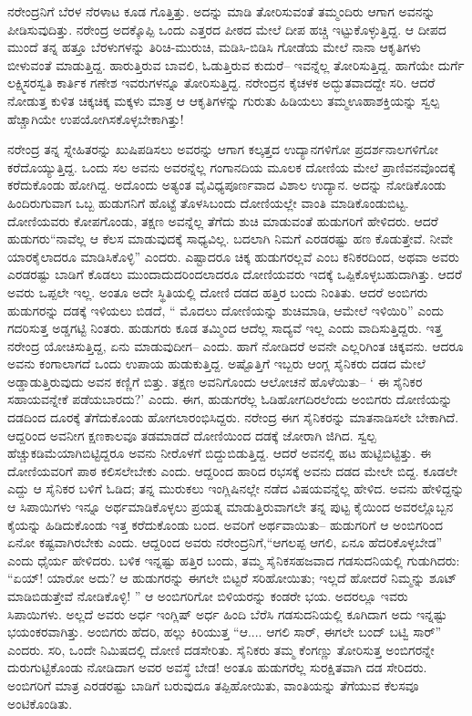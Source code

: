 ನರೇಂದ್ರನಿಗೆ ಬೆರಳ ನೆರಳಾಟ  ಕೂಡ ಗೊತ್ತಿತ್ತು. ಅದನ್ನು ಮಾಡಿ ತೋರಿಸುವಂತೆ ತಮ್ಮಂದಿರು ಆಗಾಗ ಅವನನ್ನು ಪೀಡಿಸುವುದಿತ್ತು. ನರೇಂದ್ರ ಅದಕ್ಕೊಪ್ಪಿ ಒಂದು ಎತ್ತರದ ಪೀಠದ ಮೇಲೆ ದೀಪ ಹಚ್ಚಿ ಇಟ್ಟುಕೊಳ್ಳುತ್ತಿದ್ದ. ಆ ದೀಪದ ಮುಂದೆ ತನ್ನ ಹತ್ತೂ ಬೆರಳುಗಳನ್ನು ತಿರಿಚಿ-ಮುರುಚಿ, ಮಡಿಸಿ-ಬಿಡಿಸಿ ಗೋಡೆಯ ಮೇಲೆ ನಾನಾ ಆಕೃತಿಗಳು ಬೀಳುವಂತೆ ಮಾಡುತ್ತಿದ್ದ. ಹಾರುತ್ತಿರುವ ಬಾವಲಿ, ಓಡುತ್ತಿರುವ ಕುದುರೆ– ಇವನ್ನೆಲ್ಲ ತೋರಿಸುತ್ತಿದ್ದ. ಹಾಗೆಯೇ ದುರ್ಗೆ ಲಕ್ಷ್ಮಿಸರಸ್ವತಿ ಕಾರ್ತಿಕ ಗಣೇಶ ಇವರುಗಳನ್ನೂ ತೋರಿಸುತ್ತಿದ್ದ. ನರೇಂದ್ರನ ಕೈಚಳಕ ಅದ್ಭುತವಾದದ್ದೇ ಸರಿ. ಆದರೆ ನೋಡುತ್ತ ಕುಳಿತ ಚಿಕ್ಕಚಿಕ್ಕ ಮಕ್ಕಳು ಮಾತ್ರ ಆ ಆಕೃತಿಗಳನ್ನು ಗುರುತು ಹಿಡಿಯಲು ತಮ್ಮಊಹಾಶಕ್ತಿಯನ್ನು ಸ್ವಲ್ಪ ಹೆಚ್ಚಾಗಿಯೇ ಉಪಯೋಗಿಸಕೊಳ್ಳಬೇಕಾಗಿತ್ತು!

ನರೇಂದ್ರ ತನ್ನ ಸ್ನೇಹಿತರನ್ನು ಖುಷಿಪಡಿಸಲು ಅವರನ್ನು ಆಗಾಗ ಕಲ್ಕತ್ತದ ಉದ್ಯಾನಗಳಿಗೋ ಪ್ರದರ್ಶನಾಲಗಳಿಗೋ ಕರೆದೊಯ್ಯುತ್ತಿದ್ದ. ಒಂದು ಸಲ ಅವನು ಅವರನ್ನೆಲ್ಲ ಗಂಗಾನದಿಯ ಮೂಲಕ ದೋಣಿಯ ಮೇಲೆ ಪ್ರಾಣಿವನವೊಂದಕ್ಕೆ ಕರೆದುಕೊಂಡು ಹೋಗಿದ್ದ. ಅದೊಂದು ಅತ್ಯಂತ ವೈವಿಧ್ಯಪೂರ್ಣವಾದ ವಿಶಾಲ ಉದ್ಯಾನ. ಅದನ್ನು ನೋಡಿಕೊಂಡು ಹಿಂದಿರುಗುವಾಗ ಒಬ್ಬ ಹುಡುಗನಿಗೆ ಹೊಟ್ಟೆ ತೊಳಸಿಬಂದು ದೋಣಿಯಲ್ಲೇ ವಾಂತಿ ಮಾಡಿಕೊಂಡುಬಿಟ್ಟ. ದೋಣಿಯವರು ಕೋಪಗೊಂಡು, ತಕ್ಷಣ ಅವನ್ನೆಲ್ಲ ತೆಗೆದು ಶುಚಿ ಮಾಡುವಂತೆ ಹುಡುಗರಿಗೆ ಹೇಳಿದರು. ಆದರೆ ಹುಡುಗರು“ನಾವೆಲ್ಲ ಆ ಕೆಲಸ ಮಾಡುವುದಕ್ಕೆ ಸಾಧ್ಯವಿಲ್ಲ. ಬದಲಾಗಿ ನಿಮಗೆ ಎರಡರಷ್ಟು ಹಣ ಕೊಡುತ್ತೇವೆ. ನೀವೇ ಯಾರಕೈಲಾದರೂ ಮಾಡಿಸಿಕೊಳ್ಳಿ” ಎಂದರು. ಎಷ್ಟಾದರೂ ಚಿಕ್ಕ ಹುಡುಗರಲ್ಲವೆ ಎಂಬ ಕನಿಕರದಿಂದ, ಅಥವಾ ಅವರು ಎರಡರಷ್ಟು ಬಾಡಿಗೆ ಕೊಡಲು ಮುಂದಾದುದರಿಂದಲಾದರೂ ದೋಣಿಯವರು ಇದಕ್ಕೆ ಒಪ್ಪಿಕೊಳ್ಳಬಹುದಾಗಿತ್ತು. ಆದರೆ ಅವರು ಒಪ್ಪಲೇ ಇಲ್ಲ. ಅಂತೂ ಅದೇ ಸ್ಥಿತಿಯಲ್ಲಿ ದೋಣಿ ದಡದ ಹತ್ತಿರ ಬಂದು ನಿಂತಿತು. ಆದರೆ ಅಂಬಿಗರು ಹುಡುಗರನ್ನು ದಡಕ್ಕೆ ಇಳಿಯಲು ಬಿಡದೆ, “ ಮೊದಲು ದೋಣಿಯನ್ನು ಶುಚಿಮಾಡಿ, ಆಮೇಲೆ ಇಳಿಯಿರಿ” ಎಂದು ಗದರಿಸುತ್ತ ಅಡ್ಡಗಟ್ಟಿ ನಿಂತರು. ಹುಡುಗರು ಕೂಡ ತಮ್ಮಿಂದ ಆದೆಲ್ಲ ಸಾದ್ಯವೆ ಇಲ್ಲ ಎಂದು ವಾದಿಸುತ್ತಿದ್ದರು. ಇತ್ತ ನರೇಂದ್ರ ಯೋಚಿಸುತ್ತಿದ್ದ, ಏನು ಮಾಡುವುದೀಗ– ಎಂದು. ಹಾಗೆ ನೋಡಿದರೆ ಅವನೇ ಎಲ್ಲರಿಗಿಂತ ಚಿಕ್ಕವನು. ಆದರೂ ಅವನು ಕಂಗಾಲಾಗದೆ ಒಂದು ಉಪಾಯ ಹುಡುಕುತ್ತಿದ್ದ. ಅಷ್ಟೊತ್ತಿಗೆ ಇಬ್ಬರು ಆಂಗ್ಲ ಸೈನಿಕರು ದಡದ ಮೇಲೆ ಅಡ್ಡಾಡುತ್ತಿರುವುದು ಅವನ ಕಣ್ಣಿಗೆ ಬಿತ್ತು. ತಕ್ಷಣ ಅವನಿಗೊಂದು ಆಲೋಚನೆ ಹೊಳೆಯಿತು– ‘ ಈ ಸೈನಿಕರ ಸಹಾಯವನ್ನೇಕೆ ಪಡೆಯಬಾರದು?’ ಎಂದು. ಈಗ, ಹುಡುಗರೆಲ್ಲ ಓಡಿಹೋಗದಿರಲೆಂದು ಅಂಬಿಗರು ದೋಣಿಯನ್ನು ದಡದಿಂದ ದೂರಕ್ಕೆ ತೆಗೆದುಕೊಂಡು ಹೋಗಲಾರಂಭಿಸಿದ್ದರು. ನರೇಂದ್ರ ಈಗ ಸೈನಿಕರನ್ನು ಮಾತನಾಡಿಸಲೇ ಬೇಕಾಗಿದೆ. ಆದ್ದರಿಂದ ಅವನೀಗ ಕ್ಷಣಕಾಲವೂ ತಡಮಾಡದೆ ದೋಣಿಯಿಂದ ದಡಕ್ಕೆ ಜೋರಾಗಿ ಜಿಗಿದ. ಸ್ವಲ್ಪ ಹೆಚ್ಚುಕಡಿಮೆಯಾಗಿಬಿಟ್ಟಿದ್ದರೂ ಅವನು ನೀರೊಳಗೆ ಬಿದ್ದುಬಿಡುತ್ತಿದ್ದ. ಆದರೆ ಅವನಲ್ಲಿ ಹಟ ಹುಟ್ಟಿಬಿಟ್ಟಿತ್ತು. ಈ ದೋಣಿಯವರಿಗೆ ಪಾಠ ಕಲಿಸಲೇಬೇಕು ಎಂದು. ಆದ್ದರಿಂದ ಹಾರಿದ ರಭಸಕ್ಕೆ ಅವನು ದಡದ ಮೇಲೇ ಬಿದ್ದ. ಕೂಡಲೇ ಎದ್ದು ಆ ಸೈನಿಕರ ಬಳಿಗೆ ಓಡಿದ; ತನ್ನ ಮುರುಕಲು ಇಂಗ್ಲಿಷಿನಲ್ಲೇ ನಡೆದ ವಿಷಯವನ್ನೆಲ್ಲ ಹೇಳಿದ. ಅವನು ಹೇಳಿದ್ದನ್ನು ಆ ಸಿಪಾಯಿಗಳು ಇನ್ನೂ ಅರ್ಥಮಾಡಿಕೊಳ್ಳಲು ಪ್ರಯತ್ನ ಮಾಡುತ್ತಿರುವಾಗಲೇ ತನ್ನ ಪುಟ್ಟ ಕೈಯಿಂದ ಅವರಲ್ಲೊಬ್ಬನ ಕೈಯನ್ನು ಹಿಡಿದುಕೊಂಡು ಇತ್ತ ಕರೆದುಕೊಂಡು ಬಂದ. ಅವರಿಗೆ ಅರ್ಥವಾಯಿತು– ಹುಡುಗರಿಗೆ ಆ ಅಂಬಿಗರಿಂದ ಏನೋ ಕಷ್ಟವಾಗಿರಬೇಕು ಎಂದು. ಆದ್ದರಿಂದ ಅವರು ನರೇಂದ್ರನಿಗೆ,“ಆಗಲಪ್ಪ ಆಗಲಿ, ಏನೂ ಹೆದರಿಕೊಳ್ಳಬೇಡ” ಎಂದು ಧೈರ್ಯ ಹೇಳಿದರು. ಬಳಿಕ ಇನ್ನಷ್ಟು ಹತ್ತಿರ ಬಂದು, ತಮ್ಮ ಸೈನಿಕಸಹಜವಾದ ಗಡಸುದನಿಯಲ್ಲಿ ಗುಡುಗಿದರು: “ಏಯ್! ಯಾರೋ ಅದು? ಆ ಹುಡುಗರನ್ನು ಈಗಲೇ ಬಿಟ್ಟರೆ ಸರಿಹೋಯಿತು; ಇಲ್ಲದೆ ಹೋದರೆ ನಿಮ್ಮನ್ನು ಶೂಟ್ ಮಾಡಿಬಿಡುತ್ತೇವೆ ನೋಡಿಕೊಳ್ಳಿ! ” ಆ ಅಂಬಿಗರಿಗೋ ಬಿಳಿಯರನ್ನು ಕಂಡರೇ ಭಯ. ಅದರಲ್ಲೂ ಇವರು ಸಿಪಾಯಿಗಳು. ಅಲ್ಲದೆ ಅವರು ಅರ್ಧ ಇಂಗ್ಲಿಷ್ ಅರ್ಧ ಹಿಂದಿ ಬೆರೆಸಿ ಗಡಸುದನಿಯಲ್ಲಿ ಕೂಗಿದಾಗ ಅದು ಇನ್ನಷ್ಟು ಭಯಂಕರವಾಗಿತ್ತು. ಅಂಬಿಗರು ಹೆದರಿ, ಹಲ್ಲು ಕಿರಿಯುತ್ತ “ಆ.... ಆಗಲಿ ಸಾರ್, ಈಗಲೇ ಬಂದ್ ಬಟ್ವಿ ಸಾರ್​” ಎಂದರು. ಸರಿ, ಒಂದೇ ನಿಮಿಷದಲ್ಲಿ ದೋಣಿ ದಡಸೇರಿತು. ಸೈನಿಕರು ತಮ್ಮ ಕೆಂಗಣ್ಣು ತೋರಿಸುತ್ತ ಅಂಬಿಗರನ್ನೇ ದುರುಗುಟ್ಟಿಕೊಂಡು ನೋಡಿದಾಗ ಅವರ ಅವಸ್ಥೆ ಬೇಡ! ಅಂತೂ ಹುಡುಗರೆಲ್ಲ ಸುರಕ್ಷಿತವಾಗಿ ದಡ ಸೇರಿದರು. ಅಂಬಿಗರಿಗೆ ಮಾತ್ರ ಎರಡರಷ್ಟು ಬಾಡಿಗೆ ಬರುವುದೂ ತಪ್ಪಿಹೋಯಿತು, ವಾಂತಿಯನ್ನು ತೆಗೆಯುವ ಕೆಲಸವೂ ಅಂಟಿಕೊಂಡಿತು.

